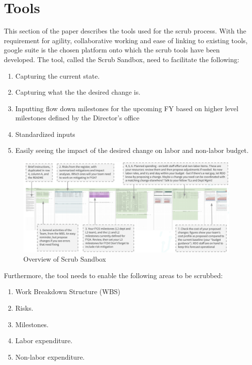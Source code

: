 \section{Tools} \label{sec:tools}

This section of the paper describes the tools used for the scrub process. With the requirement for agility, collaborative working and ease of linking to existing tools, google suite is the chosen platform onto which the scrub tools have been developed. The tool, called the Scrub Sandbox,  need to facilitate the following:

\begin{enumerate}
\item Capturing the current state.
\item Capturing what the the desired change is.
\item Inputting flow down milestones for the upcoming FY based on higher level milestones defined by the Director’s office
\item Standardized inputs
\item Easily seeing the impact of the desired change on labor and non-labor budget.
\end{enumerate}

\begin{figure}[h!]
\begin{centering}
\includegraphics[width=1.0\textwidth]{Figure3OverviewScrubSandbox}
	\caption{ Overview of Scrub Sandbox
\label{fig:sandbox}}
\end{centering}
\end{figure}


Furthermore, the tool needs to enable the following areas to be scrubbed:
\begin{enumerate}
\item Work Breakdown Structure (WBS)
\item Risks.
\item Milestones.
\item Labor expenditure.
\item Non-labor expenditure.
\end{enumerate}

